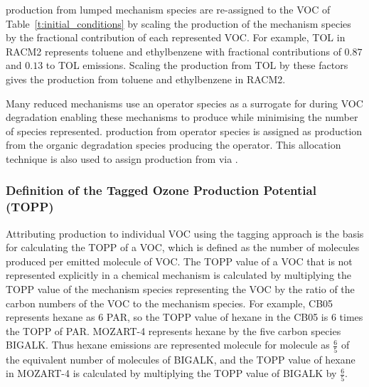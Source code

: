  production from lumped mechanism species are re-assigned to the VOC of \mbox{Table \ref{t:initial_conditions}} by scaling the  production of the mechanism species by the fractional contribution of each represented VOC.
For example, TOL in RACM2 represents toluene and ethylbenzene with fractional contributions of $0.87$ and $0.13$ to TOL emissions.
Scaling the  production from TOL by these factors gives the  production from toluene and ethylbenzene in RACM2.

Many reduced mechanisms use an operator species as a surrogate for  during VOC degradation enabling these mechanisms to produce  while minimising the number of  species represented.
 production from operator species is assigned as  production from the organic degradation species producing the operator.
This allocation technique is also used to assign  production from  via .
%
\subsubsection{Definition of the Tagged Ozone Production Potential (TOPP)} \label{sss:TOPP} %
%
Attributing  production to individual VOC using the tagging approach is the basis for calculating the TOPP of a VOC, which is defined as the number of  molecules produced per emitted molecule of VOC.
The TOPP value of a VOC that is not represented explicitly in a chemical mechanism is calculated by multiplying the TOPP value of the mechanism species representing the VOC by the ratio of the carbon numbers of the VOC to the mechanism species.
For example, CB05 represents hexane as $6$ PAR, so the TOPP value of hexane in the CB05 is $6$ times the TOPP of PAR.
MOZART-4 represents hexane by the five carbon species BIGALK.
Thus hexane emissions are represented molecule for molecule as $\frac{6}{5}$ of the equivalent number of molecules of BIGALK, and the TOPP value of hexane in MOZART-4 is calculated by multiplying the TOPP value of BIGALK by $\frac{6}{5}$.
